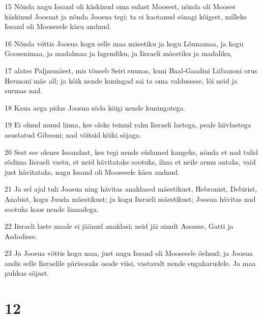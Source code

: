 \par 15 Nõnda nagu Issand oli käskinud oma sulast Moosest, nõnda oli Mooses käskinud Joosuat ja nõnda Joosua tegi; ta ei kaotanud sõnagi kõigest, milleks Issand oli Moosesele käsu andnud.
\par 16 Nõnda võttis Joosua kogu selle maa mäestiku ja kogu Lõunamaa, ja kogu Goosenimaa, ja madalmaa ja lagendiku, ja Iisraeli mäestiku ja madaliku,
\par 17 alates Paljasmäest, mis tõuseb Seiri suunas, kuni Baal-Gaadini Liibanoni orus Hermoni mäe all; ja kõik nende kuningad sai ta oma valdusesse, lõi neid ja surmas nad.
\par 18 Kaua aega pidas Joosua sõda kõigi nende kuningatega.
\par 19 Ei olnud muud linna, kes oleks teinud rahu Iisraeli lastega, peale hiivlastega asustatud Gibeoni; nad võitsid kõiki sõjaga.
\par 20 Sest see olenes Issandast, kes tegi nende südamed kangeks, nõnda et nad tulid sõdima Iisraeli vastu, et neid hävitataks sootuks, ilma et neile armu antaks, vaid just hävitataks, nagu Issand oli Moosesele käsu andnud.
\par 21 Ja sel ajal tuli Joosua ning hävitas anaklased mäestikust, Hebronist, Debirist, Anabist, kogu Juuda mäestikust; ja kogu Iisraeli mäestikust; Joosua hävitas nad sootuks koos nende linnadega.
\par 22 Iisraeli laste maale ei jäänud anaklasi; neid jäi ainult Assasse, Gatti ja Asdodisse.
\par 23 Ja Joosua võttis kogu maa, just nagu Issand oli Moosesele öelnud; ja Joosua andis selle Iisraelile pärisosaks osade viisi, vastavalt nende suguharudele. Ja maa puhkas sõjast.

\chapter{12}

